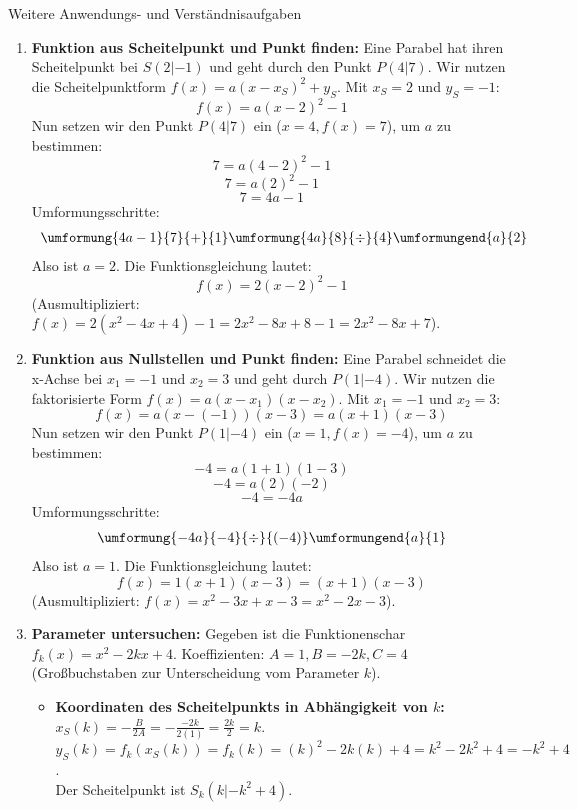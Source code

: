 \begin{loesungsumgebung}{Weitere Anwendungs- und Verständnisaufgaben}
\begin{enumerate}
    \item \textbf{Funktion aus Scheitelpunkt und Punkt finden:}
    Eine Parabel hat ihren Scheitelpunkt bei $S(2|-1)$ und geht durch den Punkt $P(4|7)$.
    Wir nutzen die Scheitelpunktform $f(x) = a(x-x_S)^2 + y_S$.
    Mit $x_S=2$ und $y_S=-1$:
    $$ f(x) = a(x-2)^2 - 1 $$
    Nun setzen wir den Punkt $P(4|7)$ ein ($x=4, f(x)=7$), um $a$ zu bestimmen:
    $$ 7 = a(4-2)^2 - 1 $$
    $$ 7 = a(2)^2 - 1 $$
    $$ 7 = 4a - 1 $$
    Umformungsschritte:
    $$
    \begin{array}{r c l c l}
    \umformung{4a - 1}{7}{+}{1}
    \umformung{4a}{8}{\div}{4}
    \umformungend{a}{2}
    \end{array}
    $$
    Also ist $a=2$. Die Funktionsgleichung lautet:
    $$ f(x) = 2(x-2)^2 - 1 $$
    (Ausmultipliziert: $f(x) = 2(x^2-4x+4)-1 = 2x^2-8x+8-1 = 2x^2-8x+7$).

    \item \textbf{Funktion aus Nullstellen und Punkt finden:}
    Eine Parabel schneidet die x-Achse bei $x_1=-1$ und $x_2=3$ und geht durch $P(1|-4)$.
    Wir nutzen die faktorisierte Form $f(x) = a(x-x_1)(x-x_2)$.
    Mit $x_1=-1$ und $x_2=3$:
    $$ f(x) = a(x-(-1))(x-3) = a(x+1)(x-3) $$
    Nun setzen wir den Punkt $P(1|-4)$ ein ($x=1, f(x)=-4$), um $a$ zu bestimmen:
    $$ -4 = a(1+1)(1-3) $$
    $$ -4 = a(2)(-2) $$
    $$ -4 = -4a $$
    Umformungsschritte:
    $$
    \begin{array}{r c l c l}
    \umformung{-4a}{-4}{\div}{(-4)}
    \umformungend{a}{1}
    \end{array}
    $$
    Also ist $a=1$. Die Funktionsgleichung lautet:
    $$ f(x) = 1(x+1)(x-3) = (x+1)(x-3) $$
    (Ausmultipliziert: $f(x) = x^2-3x+x-3 = x^2-2x-3$).

    \item \textbf{Parameter untersuchen:} Gegeben ist die Funktionenschar $f_k(x) = x^2 - 2kx + 4$.
    Koeffizienten: $A=1, B=-2k, C=4$ (Großbuchstaben zur Unterscheidung vom Parameter $k$).
    \begin{itemize}
        \item \textbf{Koordinaten des Scheitelpunkts in Abhängigkeit von $k$:} \\
        $x_S(k) = -\frac{B}{2A} = -\frac{-2k}{2(1)} = \frac{2k}{2} = k$. \\
        $y_S(k) = f_k(x_S(k)) = f_k(k) = (k)^2 - 2k(k) + 4 = k^2 - 2k^2 + 4 = -k^2 + 4$. \\
        Der Scheitelpunkt ist $S_k(k | -k^2+4)$.


\end{itemize}
\end{enumerate}
\end{loesungsumgebung}
